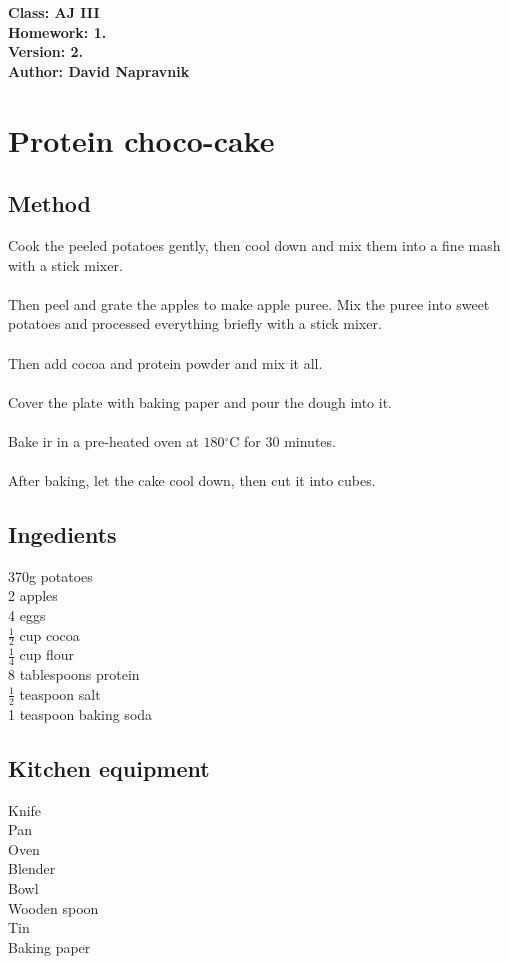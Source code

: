 \documentclass[a4paper]{article}
\begin{document}
\noindent
\textbf{Class: AJ III}\\
\textbf{Homework: 1.}\\
\textbf{Version: 2.}\\
\textbf{Author: David Napravnik}

\section*{Protein choco-cake}

\subsection*{Method}
Cook the peeled potatoes gently, then cool down and mix
them into a fine mash with a stick mixer.
\\\\
Then peel and grate the apples to make apple puree. Mix the
puree into sweet potatoes and processed everything briefly with a stick mixer.
\\\\
Then add cocoa and protein powder and mix it all.
\\\\
Cover the plate with baking paper and pour the dough into it.
\\\\
Bake ir in a pre-heated oven at $180{}^\circ$C for 30 minutes.
\\\\
After baking, let the cake cool down, then cut it into cubes.


\begin{multicols}{2}
	\subsection*{Ingedients}
	370g potatoes\\
	2 apples\\
	4 eggs\\
	$\frac{1}{2}$ cup cocoa\\
	$\frac{1}{4}$ cup flour\\
	8 tablespoons protein\\
	$\frac{1}{2}$ teaspoon salt\\
	1 teaspoon baking soda
	
	

	\subsection*{Kitchen equipment}
	Knife\\
	Pan\\
	Oven\\
	Blender\\
	Bowl\\
	Wooden spoon\\
	Tin\\
	Baking paper

	
		
\end{multicols}
\end{document}
